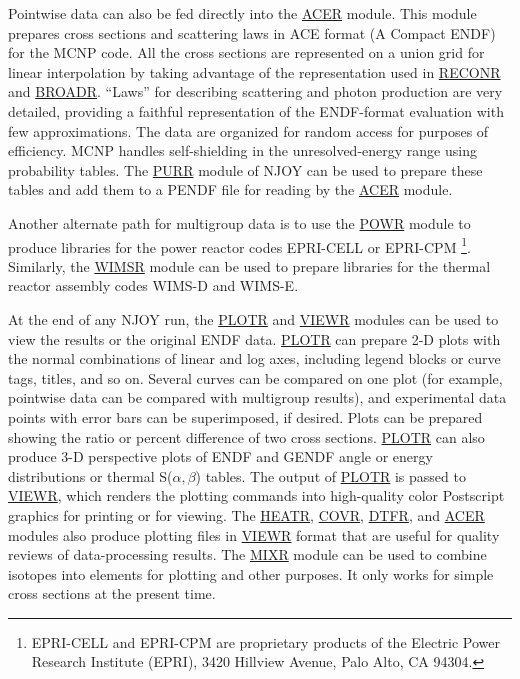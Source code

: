 Pointwise data can also be fed directly into the
\hyperlink{sACERhy}{ACER}
module.  This module prepares cross sections and scattering laws
in ACE format (A Compact ENDF) for the MCNP
code\cite{MCNP}.  All the cross sections are
represented on a union grid for linear interpolation
by taking advantage of the representation used in
\hyperlink{sRECONRhy}{RECONR} and
\hyperlink{sBROADRhy}{BROADR}.  ``Laws'' for
describing scattering and photon production
are very detailed, providing a faithful representation of the
ENDF-format evaluation with few approximations.  The data are
organized for random access for purposes of efficiency.   MCNP
handles self-shielding in the unresolved-energy range using
probability tables.  The \hyperlink{sPURRhy}{PURR}
 module of NJOY can
be used to prepare these tables and add them to a PENDF file
for reading by the \hyperlink{sACERhy}{ACER} module.

Another alternate path for multigroup data is to use the
\hyperlink{sPOWRhy}{POWR} module
to produce libraries for the power reactor
codes EPRI-CELL or EPRI-CPM
\footnote{EPRI-CELL and EPRI-CPM are proprietary products
of the Electric Power Research Institute (EPRI), 3420
Hillview Avenue, Palo Alto, CA 94304.}.  Similarly, the
\hyperlink{sWIMSRhy}{WIMSR} module
can be used to prepare libraries
for the thermal reactor assembly codes WIMS-D
and WIMS-E\cite{WIMS}.

At the end of any NJOY run, the \hyperlink{sPLOTRhy}{PLOTR}
 and \hyperlink{sVIEWRhy}{VIEWR}
 modules can be used to view the results
or the original ENDF data.  \hyperlink{sPLOTRhy}{PLOTR}
can prepare 2-D plots with
the normal combinations of linear and log axes, including
legend blocks or curve tags, titles, and so on.  Several curves
can be compared on one plot (for example, pointwise data can
be compared with multigroup results), and experimental data
points with error bars can be superimposed, if desired.
Plots can be prepared showing the ratio or percent difference
of two cross sections.  \hyperlink{sPLOTRhy}{PLOTR}
can also produce 3-D perspective
plots of ENDF and GENDF angle or energy distributions
or thermal S($\alpha,\beta$) tables.   The output of
\hyperlink{sPLOTRhy}{PLOTR} is passed to
\hyperlink{sVIEWRhy}{VIEWR}, which renders the plotting commands into
high-quality color Postscript graphics for printing or for viewing.
The \hyperlink{sHEATRhy}{HEATR}, \hyperlink{sCOVRhy}{COVR},
\hyperlink{sDTFRhy}{DTFR}, and \hyperlink{sACERhy}{ACER}
modules also produce plotting files in \hyperlink{sVIEWRhy}{VIEWR}
format that are useful for quality reviews of data-processing
results.  The \hyperlink{sMIXRhy}{MIXR} module can be used
to combine isotopes into elements for plotting and other purposes.
It only works for simple cross sections at the present time.

